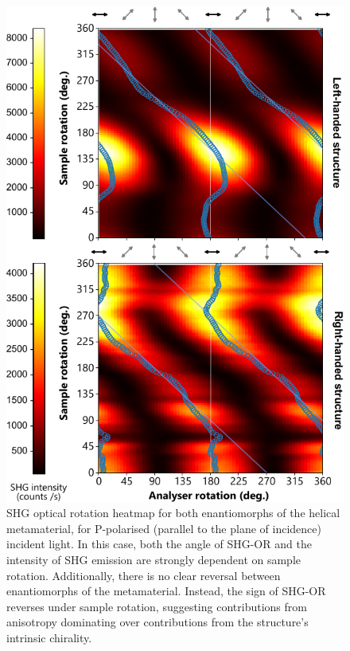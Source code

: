 \begin{figure}[htb!]	
    \centering	
    \includegraphics[scale=1]{./figures/results/OAinPlanarNanohelices/p_data.pdf}

    \caption{\label{fig:results:OAinPlanarNanohelices:p_data}
    SHG optical rotation heatmap for both enantiomorphs of the helical metamaterial, for P-polarised (parallel to the plane of incidence) incident light. In this case, both the angle of SHG-OR and the intensity of SHG emission are strongly dependent on sample rotation. Additionally, there is no clear reversal between enantiomorphs of the metamaterial. Instead, the sign of SHG-OR reverses under sample rotation, suggesting contributions from anisotropy dominating over contributions from the structure's intrinsic chirality.}	
\end{figure}


